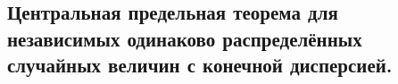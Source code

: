 \subsection{Центральная предельная теорема для независимых одинаково распределённых случайных величин с конечной дисперсией.}
